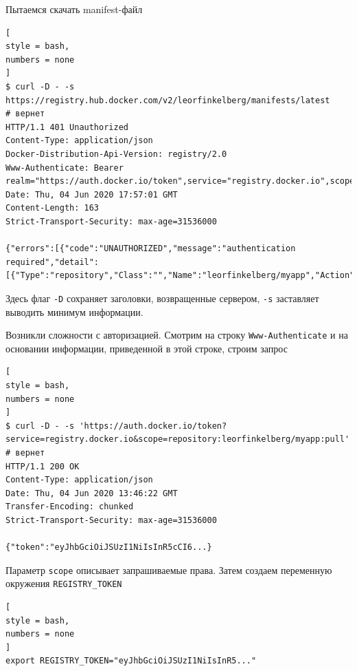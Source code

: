 \documentclass[%
	11pt,
	a4paper,
	utf8,
		]{article}
\begin{document}
Пытаемся скачать manifest-файл
\begin{lstlisting}[
style = bash,
numbers = none
]
$ curl -D - -s https://registry.hub.docker.com/v2/leorfinkelberg/manifests/latest
# вернет
HTTP/1.1 401 Unauthorized
Content-Type: application/json
Docker-Distribution-Api-Version: registry/2.0
Www-Authenticate: Bearer realm="https://auth.docker.io/token",service="registry.docker.io",scope="repository:leorfinkelberg/myapp:pull"
Date: Thu, 04 Jun 2020 17:57:01 GMT
Content-Length: 163
Strict-Transport-Security: max-age=31536000

{"errors":[{"code":"UNAUTHORIZED","message":"authentication required","detail":[{"Type":"repository","Class":"","Name":"leorfinkelberg/myapp","Action":"pull"}]}]}
\end{lstlisting}

Здесь флаг \verb|-D| сохраняет заголовки, возвращенные сервером, \verb|-s| заставляет выводить минимум информации.

Возникли сложности с авторизацией. Смотрим на строку \texttt{Www-Authenticate} и на основании информации, приведенной в этой строке, строим запрос
\begin{lstlisting}[
style = bash,
numbers = none
]
$ curl -D - -s 'https://auth.docker.io/token?service=registry.docker.io&scope=repository:leorfinkelberg/myapp:pull'
# вернет
HTTP/1.1 200 OK
Content-Type: application/json
Date: Thu, 04 Jun 2020 13:46:22 GMT
Transfer-Encoding: chunked
Strict-Transport-Security: max-age=31536000

{"token":"eyJhbGciOiJSUzI1NiIsInR5cCI6...}
\end{lstlisting}

Параметр \verb|scope| описывает запрашиваемые права. Затем создаем переменную окружения \texttt{REGISTRY\_TOKEN}
\begin{lstlisting}[
style = bash,
numbers = none
]
export REGISTRY_TOKEN="eyJhbGciOiJSUzI1NiIsInR5..."
\end{lstlisting}
\end{document}
